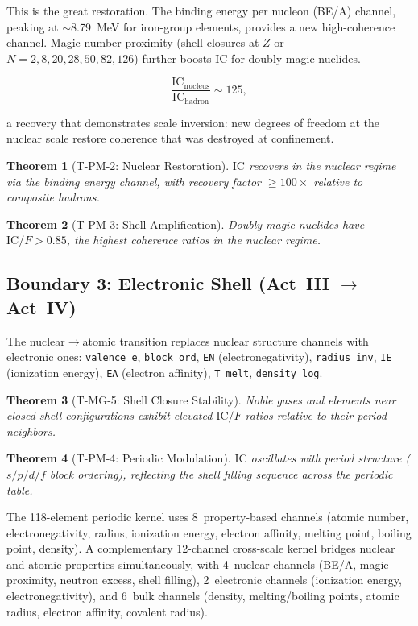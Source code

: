 \documentclass[
  aps,
  prd,
  twocolumn,
  superscriptaddress,
  nofootinbib,
  floatfix
]{revtex4-2}
\newtheorem{theorem}{Theorem}
\newcommand{\beq}{\begin{equation}}
\newcommand{\eeq}{\end{equation}}
\newcommand{\IC}{\mathrm{IC}}
\begin{document}
This is the great restoration.  The binding energy per nucleon
(BE/A) channel, peaking at $\sim$8.79~MeV for iron-group
elements, provides a new high-coherence channel.  Magic-number
proximity (shell closures at $Z$ or $N = 2, 8, 20, 28, 50, 82,
126$) further boosts $\IC$ for doubly-magic nuclides.

\beq\label{eq:nuclear}
  \frac{\IC_{\text{nucleus}}}{\IC_{\text{hadron}}} \sim 125,
\eeq

a recovery that demonstrates scale inversion: new degrees of
freedom at the nuclear scale restore coherence that was
destroyed at confinement.

\begin{theorem}[T-PM-2: Nuclear Restoration]
\label{thm:nuclear}
$\IC$ recovers in the nuclear regime via the binding energy
channel, with recovery factor $\geq 100\times$ relative to
composite hadrons.
\end{theorem}

\begin{theorem}[T-PM-3: Shell Amplification]
\label{thm:shell}
Doubly-magic nuclides have $\IC/F > 0.85$, the highest
coherence ratios in the nuclear regime.
\end{theorem}

\subsection{Boundary 3: Electronic Shell (Act~III $\to$ Act~IV)}
\label{sec:electronic}

The nuclear$\to$atomic transition replaces nuclear structure
channels with electronic ones: \texttt{valence\_e},
\texttt{block\_ord}, \texttt{EN} (electronegativity),
\texttt{radius\_inv}, \texttt{IE} (ionization energy),
\texttt{EA} (electron affinity), \texttt{T\_melt},
\texttt{density\_log}.

\begin{theorem}[T-MG-5: Shell Closure Stability]
\label{thm:shellclosure}
Noble gases and elements near closed-shell configurations
exhibit elevated $\IC/F$ ratios relative to their period
neighbors.
\end{theorem}

\begin{theorem}[T-PM-4: Periodic Modulation]
\label{thm:periodic}
$\IC$ oscillates with period structure ($s/p/d/f$ block
ordering), reflecting the shell filling sequence across
the periodic table.
\end{theorem}

The 118-element periodic kernel uses 8~property-based channels
(atomic number, electronegativity, radius, ionization energy,
electron affinity, melting point, boiling point, density).
A complementary 12-channel cross-scale kernel bridges nuclear
and atomic properties simultaneously, with 4~nuclear channels
(BE/A, magic proximity, neutron excess, shell filling),
2~electronic channels (ionization energy, electronegativity),
and 6~bulk channels (density, melting/boiling points, atomic
radius, electron affinity, covalent radius).
\end{document}
